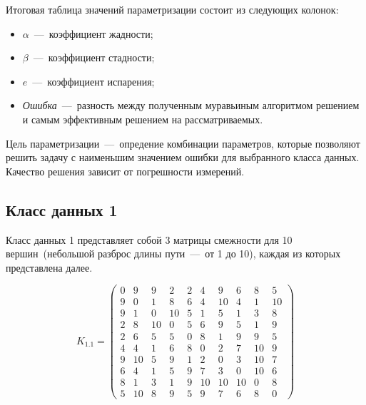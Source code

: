 Итоговая таблица значений параметризации состоит из следующих колонок:
\begin{itemize}[label=---]
	\item $\alpha$~---~коэффициент жадности;
	\item $\beta$~---~коэффициент стадности;
	\item $e$~---~коэффициент испарения;
	\item \textit{Ошибка}~---~разность между полученным муравьиным алгоритмом решением и самым эффективным решением на рассматриваемых.
\end{itemize}

Цель параметризации~---~опредение комбинации параметров, которые позволяют решить задачу с наименьшим значением ошибки для выбранного класса данных.
Качество решения зависит от погрешности измерений.


\subsection{Класс данных 1}\label{par:class1}

Класс данных 1 представляет собой 3 матрицы смежности для 10 вершин~(небольшой разброс длины пути~---~от 1 до 10), каждая из которых представлена далее.

\begin{equation}
	\label{eq:kd1.1}
	K_{1.1} = \begin{pmatrix}
		0 & 9 & 9 & 2 & 2 & 4 & 9 & 6 & 8 & 5 \\ 
		9 & 0 & 1 & 8 & 6 & 4 & 10 & 4 & 1 & 10 \\ 
		9 & 1 & 0 & 10 & 5 & 1 & 5 & 1 & 3 & 8 \\ 
		2 & 8 & 10 & 0 & 5 & 6 & 9 & 5 & 1 & 9 \\ 
		2 & 6 & 5 & 5 & 0 & 8 & 1 & 9 & 9 & 5 \\ 
		4 & 4 & 1 & 6 & 8 & 0 & 2 & 7 & 10 & 9 \\ 
		9 & 10 & 5 & 9 & 1 & 2 & 0 & 3 & 10 & 7 \\ 
		6 & 4 & 1 & 5 & 9 & 7 & 3 & 0 & 10 & 6 \\ 
		8 & 1 & 3 & 1 & 9 & 10 & 10 & 10 & 0 & 8 \\ 
		5 & 10 & 8 & 9 & 5 & 9 & 7 & 6 & 8 & 0
	\end{pmatrix}
\end{equation}

